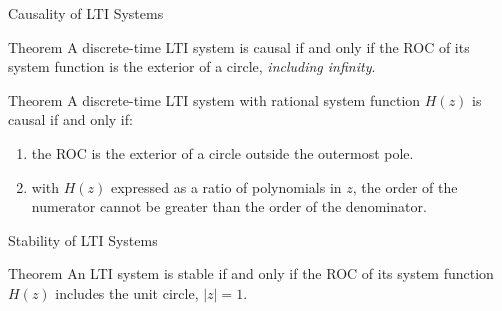 \documentclass[aspectratio=169]{beamer}
\begin{document}
\begin{frame}{Causality of LTI Systems}
	\begin{block}{Theorem}
		A discrete-time LTI system is causal if and only if the ROC of its system function is	the exterior of a circle, \textit{including infinity}.
	\end{block}

	\begin{block}{Theorem}
		A discrete-time LTI system with rational system function $ H(z) $ is causal if and only if:
		\begin{enumerate}[label=(\alph*)]
			\item the ROC is the exterior of a circle outside the outermost pole.
			\item with $ H(z) $	expressed as a ratio of polynomials in $ z $, the order of the numerator cannot be greater than the order of the denominator. 
		\end{enumerate}
	\end{block}
	\end{frame}

	\begin{frame}{Stability of LTI Systems}
		\begin{block}{Theorem}
			An LTI system is stable if and only if the ROC of its system function $ H(z) $ includes the unit circle, $ |z| = 1 $.
		\end{block}	
	\end{frame}
\end{document}
